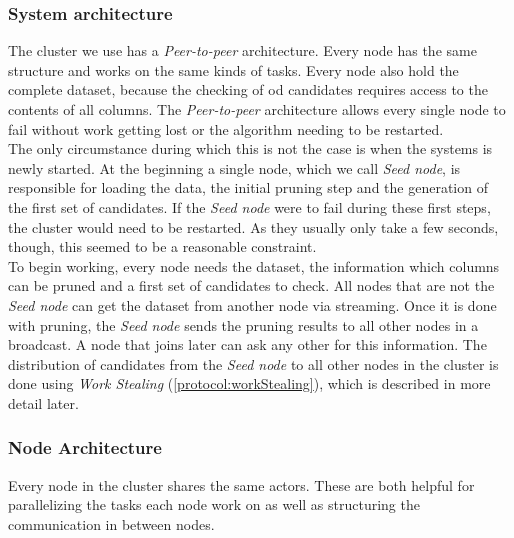 \subsubsection{System architecture}
The cluster we use has a \emph{Peer-to-peer} architecture.
Every node has the same structure and works on the same kinds of tasks.
Every node also hold the complete dataset, because the checking of \gls{od} candidates requires access to the contents of all columns.
The \emph{Peer-to-peer} architecture allows every single node to fail without work getting lost or the algorithm needing to be restarted. \\
The only circumstance during which this is not the case is when the systems is newly started. 
At the beginning a single node, which we call \emph{Seed node}, is responsible for loading the data, the initial pruning step and the generation of the first set of candidates. 
If the \emph{Seed node} were to fail during these first steps, the cluster would need to be restarted. 
As they usually only take a few seconds, though, this seemed to be a reasonable constraint.\\
To begin working, every node needs the dataset, the information which columns can be pruned and a first set of candidates to check. 
All nodes that are not the \emph{Seed node} can get the dataset from another node via streaming. 
Once it is done with pruning, the \emph{Seed node} sends the pruning results to all other nodes in a broadcast.
A node that joins later can ask any other for this information.
The distribution of candidates from the \emph{Seed node} to all other nodes in the cluster is done using \emph{Work Stealing} (\cref{protocol:workStealing}), which is described in more detail later.

\subsubsection{Node Architecture}
Every node in the cluster shares the same actors.
These are both helpful for parallelizing the tasks each node work on as well as structuring the communication in between nodes.

